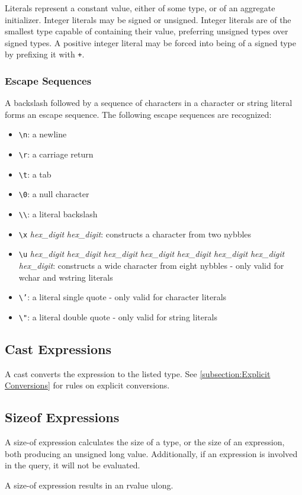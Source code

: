 \documentclass[letterpaper,12pt]{book}
\begin{document}
Literals represent a constant value, either of some type, or of an aggregate initializer. Integer literals may be signed or unsigned. Integer literals are of the smallest type capable of containing their value, preferring unsigned types over signed types. A positive integer literal may be forced into being of a signed type by prefixing it with \texttt{+}.

\subsubsection{Escape Sequences}

A backslash followed by a sequence of characters in a character or string literal forms an escape sequence. The following escape sequences are recognized:

\begin{itemize}
	\item \texttt{\textbackslash n}: a newline
	\item \texttt{\textbackslash r}: a carriage return
	\item \texttt{\textbackslash t}: a tab
	\item \texttt{\textbackslash 0}: a null character
	\item \texttt{\textbackslash\textbackslash}: a literal backslash
	\item \texttt{\textbackslash x} \textit{hex\_digit} \textit{hex\_digit}: constructs a character from two nybbles
	\item \texttt{\textbackslash u} \textit{hex\_digit} \textit{hex\_digit} \textit{hex\_digit} \textit{hex\_digit} \textit{hex\_digit} \textit{hex\_digit} \textit{hex\_digit} \textit{hex\_digit}: constructs a wide character from eight nybbles - only valid for wchar and wstring literals
	\item \texttt{\textbackslash '}: a literal single quote - only valid for character literals
	\item \texttt{\textbackslash "}: a literal double quote - only valid for string literals
\end{itemize}

\subsection{Cast Expressions}

A cast converts the expression to the listed type. See \ref{subsection:Explicit Conversions} for rules on explicit conversions.

\subsection{Sizeof Expressions}

A size-of expression calculates the size of a type, or the size of an expression, both producing an unsigned long value. Additionally, if an expression is involved in the query, it will not be evaluated.

A size-of expression results in an rvalue ulong.
\end{document}
